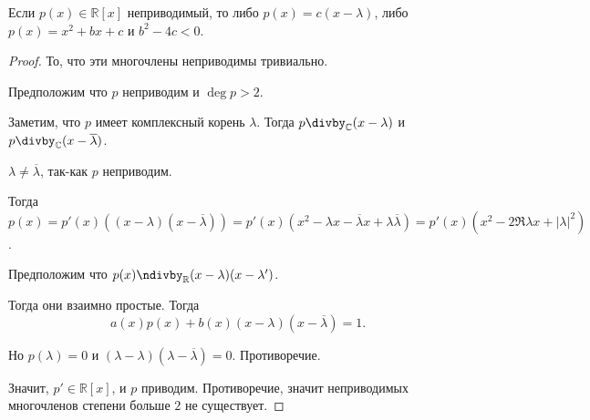 \begin{statement} 
    Если $p(x)\in \mathbb{R}[x]$ неприводимый, то либо $p(x) = c(x-\lambda)$, либо $p(x) = x^2+bx+c$ и $b^2-4c < 0$.
    \begin{proof}
        То, что эти многочлены неприводимы тривиально.

        Предположим что $p$ неприводим и $\deg p > 2$.

        Заметим, что $p$ имеет комплексный корень $\lambda$. Тогда $p \divby_{\mathbb{C}} (x-\lambda)$ и $p \divby_{\mathbb{C}} (x-\overline{\lambda})$.

        $\lambda \neq \overline{\lambda}$, так-как $p$ неприводим.

        Тогда $p(x) = p'(x) ((x-\lambda)(x-\overline{\lambda})) = p'(x) \left( x^2-\lambda x - \overline{\lambda} x + \lambda \overline{\lambda} \right) = p'(x)\left( x^2 - 2 \Re \lambda x + |\lambda|^2 \right)  $.

        Предположим что $p(x) \ndivby_{\mathbb{R}} (x-\lambda)(x-\lambda')$.

        Тогда они взаимно простые. Тогда 
        \[ a(x)p(x) + b(x)(x-\lambda)(x-\overline{\lambda})=1 .\]

        Но $p (\lambda) = 0$ и $(\lambda - \lambda)(\lambda - \overline{\lambda}) = 0$. Противоречие.

        Значит, $p'\in \mathbb{R}[x]$, и $p$ приводим. Противоречие, значит неприводимых многочленов степени больше $2$ не существует.
    \end{proof}
\end{statement}
